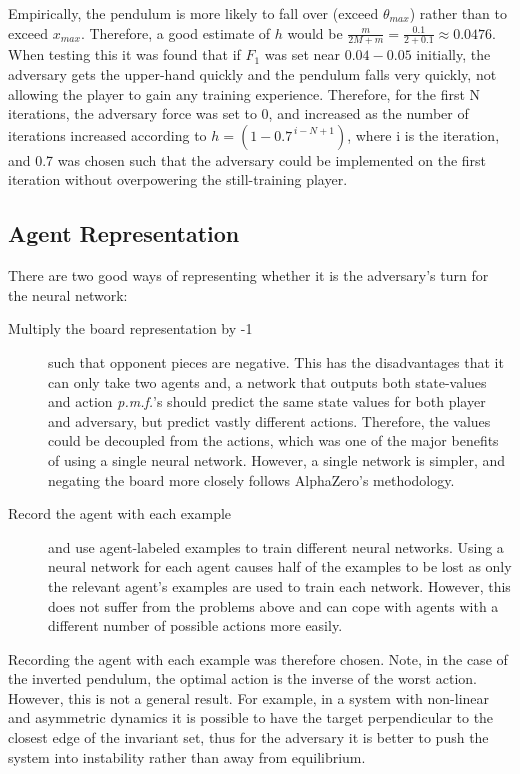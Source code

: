 \documentclass[../main.tex]{subfiles}
\begin{document}
Empirically, the pendulum is more likely to fall over (exceed $\theta_{max}$) rather than to exceed $x_{max}$. Therefore, a good estimate of $h$ would be $\frac{m}{2M+m} = \frac{0.1}{2+0.1} \approx 0.0476$. When testing this it was found that if $F_1$ was set near $0.04-0.05$ initially, the adversary gets the upper-hand quickly and the pendulum falls very quickly, not allowing the player to gain any training experience. Therefore, for the first N iterations, the adversary force was set to 0, and increased as the number of iterations increased according to $h = (1-0.7^{\,i-N+1})$, where i is the iteration, and 0.7 was chosen such that the adversary could be implemented on the first iteration without overpowering the still-training player.

\subsection{Agent Representation}

There are two good ways of representing whether it is the adversary's turn for the neural network: 
\begin{description}
   \item[Multiply the board representation by -1] such that opponent pieces are negative. This has the disadvantages that it can only take two agents and, a network that outputs both state-values and action \textit{p.m.f.}'s should predict the same state values for both player and adversary, but predict vastly different actions. Therefore, the values could be decoupled from the actions, which was one of the major benefits of using a single neural network. However, a single network is simpler, and negating the board more closely follows AlphaZero's methodology.

   \item[Record the agent with each example] and use agent-labeled examples to train different neural networks. Using a neural network for each agent causes half of the examples to be lost as only the relevant agent's examples are used to train each network. However, this does not suffer from the problems above and can cope with agents with a different number of possible actions more easily.
\end{description}

Recording the agent with each example was therefore chosen. Note, in the case of the inverted pendulum, the optimal action is the inverse of the worst action. However, this is not a general result. For example, in a system with non-linear and asymmetric dynamics it is possible to have the target perpendicular to the closest edge of the invariant set, thus for the adversary it is better to push the system into instability rather than away from equilibrium.
\end{document}
